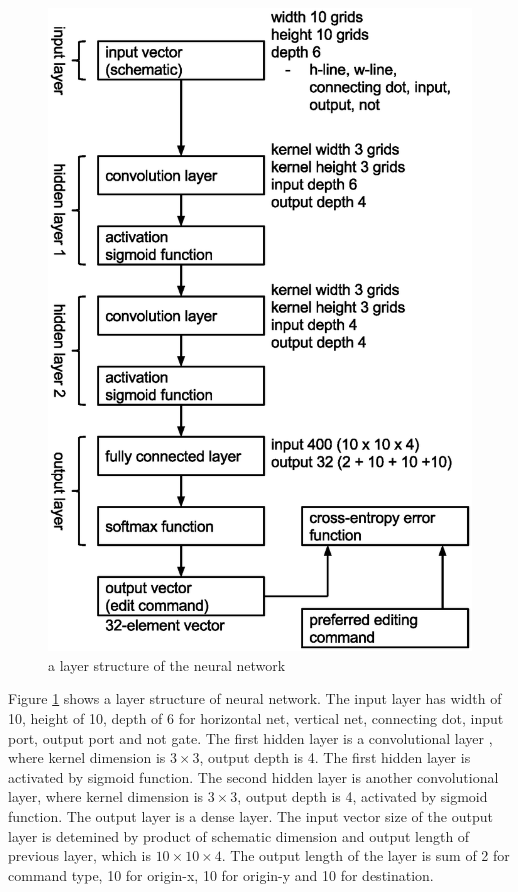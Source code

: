 \documentclass[twocolumn]{article}
\begin{document}
\begin{figure}[!tp]
 \begin{center}
  \begin{minipage}{\hsize}
   \includegraphics[width=\hsize]{fig/layers.eps}
   \caption{a layer structure of the neural network}
   \label{fig:layers}
  \end{minipage}
 \end{center}
\end{figure}

Figure \ref{fig:layers} shows a layer structure of neural network.
The input layer has width of 10, height of 10,
depth of 6 for horizontal net, vertical net, connecting dot, input port,
output port and not gate.
The first hidden layer is a convolutional layer \cite{mit},
where kernel dimension is $3\times 3$, output depth is 4.
The first hidden layer is activated by sigmoid function.
The second hidden layer is another convolutional layer,
where kernel dimension is $3\times 3$, output depth is 4,
activated by sigmoid function.
The output layer is a dense layer.
The input vector size of the output layer
is detemined by product of schematic dimension
and output length of previous layer, which is $10 \times 10 \times 4$.
The output length of the layer is sum of 2 for command type,
10 for origin-x, 10 for origin-y and 10 for destination.
\end{document}
